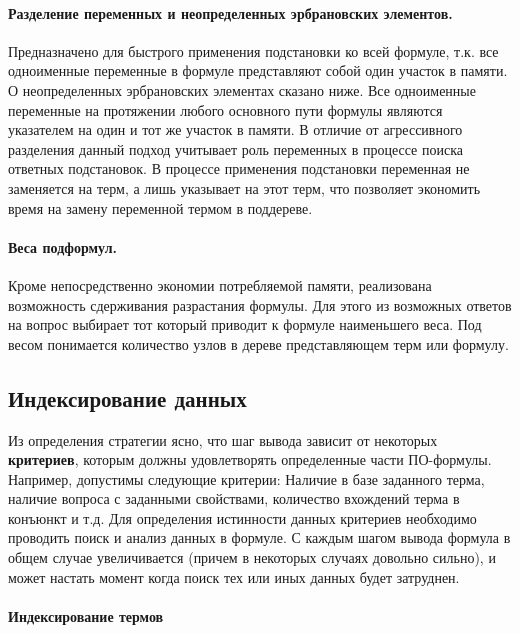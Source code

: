 \paragraph{Разделение переменных и неопределенных эрбрановских элементов.} Предназначено для быстрого применения подстановки ко всей формуле, т.к. все одноименные переменные в формуле представляют собой один участок в памяти. О неопределенных эрбрановских элементах сказано ниже. Все одноименные переменные на протяжении любого основного пути формулы \cite{dissChe} являются указателем на один и тот же участок в памяти. В отличие от агрессивного разделения данный подход учитывает роль переменных в процессе поиска ответных подстановок. В процессе применения подстановки переменная не заменяется на терм, а лишь указывает на этот терм, что позволяет экономить время на замену переменной термом в поддереве.

\paragraph{Веса подформул.} Кроме непосредственно экономии потребляемой памяти, реализована возможность сдерживания разрастания формулы. Для этого из возможных ответов на вопрос выбирает тот который приводит к формуле наименьшего веса. Под весом понимается количество узлов в дереве представляющем терм или формулу.


\subsection{Индексирование данных}

Из определения стратегии ясно, что шаг вывода зависит от некоторых \textbf{критериев}, которым должны удовлетворять определенные части ПО-формулы. Например, допустимы следующие критерии: Наличие в базе заданного терма, наличие вопроса с заданными свойствами, количество вхождений терма в конъюнкт и т.д. Для определения истинности данных критериев необходимо проводить поиск и анализ данных в формуле. С каждым шагом вывода формула в общем случае увеличивается (причем в некоторых случаях довольно сильно), и может настать момент когда поиск тех или иных данных будет затруднен.

\paragraph{Индексирование термов}

